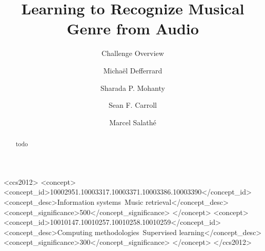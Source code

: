 \documentclass[sigconf]{acmart}
\begin{document}
\title{Learning to Recognize Musical Genre from Audio}
\subtitle{Challenge Overview}


\author{Michaël Defferrard}

\author{Sharada P. Mohanty}

\author{Sean F. Carroll}

\author{Marcel Salathé}



\begin{abstract}
	todo
\end{abstract}


 \begin{CCSXML}
<ccs2012>
  <concept>
    <concept_id>10002951.10003317.10003371.10003386.10003390</concept_id>
    <concept_desc>Information systems~Music retrieval</concept_desc>
    <concept_significance>500</concept_significance>
  </concept>
  <concept>
    <concept_id>10010147.10010257.10010258.10010259</concept_id>
    <concept_desc>Computing methodologies~Supervised learning</concept_desc>
    <concept_significance>300</concept_significance>
  </concept>
</ccs2012>
\end{CCSXML}

\end{document}
